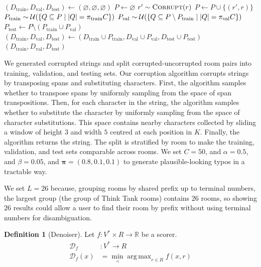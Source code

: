 \documentclass{article}
\theoremstyle{definition}
\newtheorem{definition}{Definition}
\DeclareMathOperator*{\argmax}{arg\,max}
\newcommand{\R}{\mathbb{R}}
\begin{document}
\begin{algorithm}[H]
	\caption{$\textsc{Split}()$}
	\begin{algorithmic}
		\State ${
			(D_\mathrm{train},D_\mathrm{val},D_\mathrm{test})
			\gets
			(\varnothing,\varnothing,\varnothing)
		}$
			\State $P\gets\varnothing$
				\State $r'\sim\textsc{Corrupt}(r)$
					$P\gets P\cup\{(r',r)\}$
				\EndIf
			\EndWhile
			\State ${
				P_\mathrm{train}
				\sim
				\mathcal{U}(\{Q\subseteq P\mid \abs{Q}=\pi_\mathrm{train}C\})
			}$
			\State ${
				P_\mathrm{val}
				\sim
				\mathcal{U}(\{Q\subseteq P\setminus P_\mathrm{train}\mid \abs{Q}=\pi_\mathrm{val}C\})
			}$
			\State ${
				P_\mathrm{test}
				\gets
				P\setminus(P_\mathrm{train}\cup P_\mathrm{val})
			}$
			\State ${
				(D_\mathrm{train},D_\mathrm{val},D_\mathrm{test})
				\gets
				(
					D_\mathrm{train}\cup P_\mathrm{train},
					D_\mathrm{val}\cup P_\mathrm{val},
					D_\mathrm{test}\cup P_\mathrm{test}
				)
			}$
		\EndFor
		\State \Return $(D_\mathrm{train},D_\mathrm{val},D_\mathrm{test})$
	\end{algorithmic}
\end{algorithm}

We generated corrupted strings
and split corrupted-uncorrupted room pairs
into training, validation, and testing sets.
Our corruption algorithm corrupts strings by transposing spans and substituting characters.
First, the algorithm samples whether to transpose spans by uniformly sampling from the space of span transpositions.
Then, for each character in the string, the algorithm samples whether to substitute the character by uniformly sampling from the space of character substitutions.
This space contains nearby characters collected by sliding a window of height $3$ and width $5$ centred at each position in $K$.
Finally, the algorithm returns the string.
The split is stratified by room to make the training, validation, and test sets comparable across rooms.
We set $C=50$, and $\alpha=0.5$, and $\beta=0.05$, and $\bm{\pi}=(0.8,0.1,0.1)$ to generate plausible-looking typos in a tractable way.

\newpage

We set $L=26$ because, grouping rooms by shared prefix up to terminal numbers,
the largest group (the group of Think Tank rooms) contains $26$ rooms,
so showing $26$ results could allow a user to find their room by prefix
without using terminal numbers for disambiguation.

\begin{definition}[Denoiser]
Let $f:V^{*}\times R\to\R$ be a scorer.
\begin{align*}
	\mathscr{D}_{f}
	&:
	V^{*}\to R
	\\
	\mathscr{D}_{f}(x)
	&=
	\min_{\prec}
	\argmax_{r\in R}
	f(x,r)
\end{align*}
\end{definition}
\end{document}

